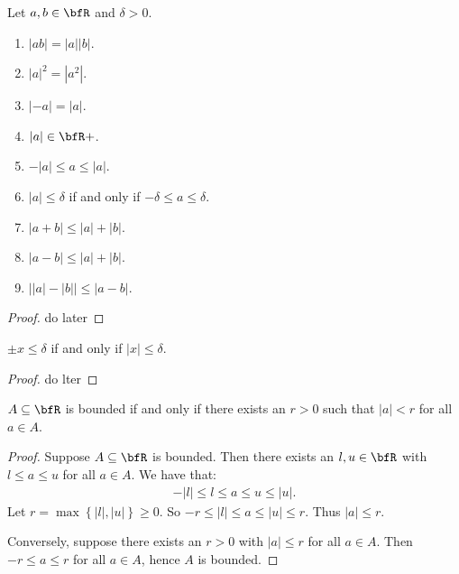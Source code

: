     \begin{proposition}
        Let $a,b \in \bfR$ and $\delta > 0$.
        \begin{enumerate}[label = (\arabic*)]
            \item $|ab| = |a||b|$.
            \item $|a|^2 = |a^2|$.
            \item $|-a| = |a|$.
            \item $|a| \in \bfR+$.
            \item $-|a| \leq a \leq |a|$.
            \item $|a| \leq \delta$ if and only if $-\delta \leq a \leq \delta$.
            \item $|a+b| \leq |a| + |b|$.
            \item $|a-b| \leq |a| + |b|$.
            \item $\left||a| - |b|\right| \leq |a - b|$.
        \end{enumerate}
    \end{proposition}
        \begin{proof}
            {\color{red} do later}
        \end{proof}

    \begin{lemma}
        $\pm x \leq \delta$ if and only if $|x| \leq \delta$.
    \end{lemma}
        \begin{proof}
            {\color{red} do lter}
        \end{proof}

    \begin{lemma}
        $A \subseteq \bfR$ is bounded if and only if there exists an $r>0$ such that $|a| < r$ for all $a \in A$.
    \end{lemma}
        \begin{proof}
            Suppose $A \subseteq \bfR$ is bounded. Then there exists an $l,u \in \bfR$ with $l \leq a \leq u$ for all $a \in A$. We have that:
                \begin{equation*}
                \begin{split}
                    -|l| \leq l \leq a \leq u \leq |u|.
                \end{split}
                \end{equation*}
            Let $r = \max{\left\{|l|, |u|\right\}} \geq 0$. So $-r \leq |l| \leq a \leq |u| \leq r$. Thus $|a| \leq r$.

            Conversely, suppose there exists an $r > 0$ with $|a| \leq r$ for all $a \in A$. Then $-r \leq  a \leq r$ for all $a \in A$, hence $A$ is bounded.
        \end{proof}
    
